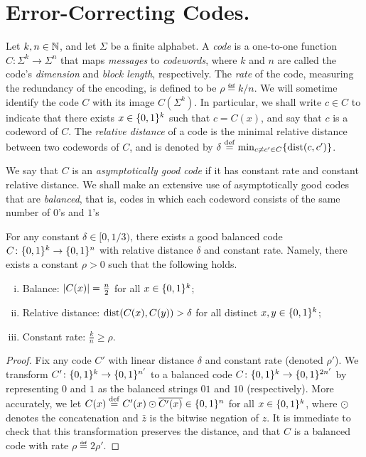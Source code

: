 \section{Error-Correcting Codes.} Let $k,n\in\mathbb{N}$, and let $\Sigma$ be a finite alphabet. A \emph{code} is a one-to-one function $C\colon\Sigma^k \to \Sigma^n$ that maps \emph{messages} to \emph{codewords}, where $k$ and $n$ are called the code's \emph{dimension} and \emph{block length}, respectively. The \emph{rate} of the code, measuring the redundancy of the encoding, is defined to be $\rho \eqdef k/n$. We will sometime identify the code $C$ with its image $C(\Sigma^k)$. In particular, we shall write $c \in C$ to indicate that there exists $x\in\{0,1\}^k$ such that $c = C(x)$, and say that $c$ is a codeword of $C$.  The \emph{relative distance} of a code is the minimal relative distance between two codewords of $C$, and is denoted by $\delta \eqdef \min_{c \neq c' \in C}\{\dist{c}{c'}\}$. 

We say that $C$ is an \emph{asymptotically good code} if it has constant rate and constant relative distance. We shall make an extensive use of asymptotically good codes that are \emph{balanced}, that is, codes in which each codeword consists of the same number of $0$'s and $1$'s

\begin{proposition}\label{lemma:good:balanced:hamming:codes}
  For any constant $\delta \in [0,1/3)$, there exists a good balanced code $C\colon \{0,1\}^k \to \{0,1\}^n$ with relative distance $\delta$ and constant rate. Namely, there exists a constant $\rho>0$ such that the following holds.
  \begin{enumerate}[(i)]
    \item Balance: $\left\lvert C(x) \right\rvert = \frac{n}{2}$ for all $x\in \{0,1\}^k$;
    \item Relative distance: $\dist{C(x)}{C(y)} > \delta$ for all distinct $x,y\in \{0,1\}^k$;
    \item Constant rate: $\frac{k}{n} \geq \rho$.
  \end{enumerate}
\end{proposition}
\begin{proof}
  Fix any code $C'$ with linear distance $\delta$ and constant rate (denoted $\rho'$). We transform $C'\colon \{0,1\}^k \to \{0,1\}^{n'}$ to a balanced code $C\colon \{0,1\}^k \to \{0,1\}^{2n'}$ by representing $0$ and $1$ as the balanced strings $01$ and $10$ (respectively). More accurately, we let $C(x) \stackrel{\rm def}{=} C'(x)\odot\overline{C'(x)}\in\{0,1\}^n$ for all $x\in\{0,1\}^k$, where  $\odot$ denotes the concatenation and $\bar{z}$ is the bitwise negation of $z$. It is immediate to check that this transformation preserves the distance, and that $C$ is a balanced code with rate $\rho\eqdef 2\rho'$.
\end{proof}

